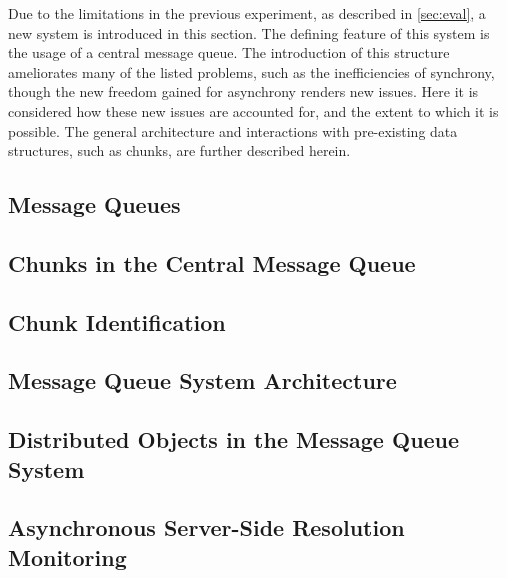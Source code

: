 Due to the limitations in the previous experiment, as described in \cref{sec:eval}, a new system is introduced in this section.
The defining feature of this system is the usage of a central message queue.
The introduction of this structure ameliorates many of the listed problems, such as the inefficiencies of synchrony, though the new freedom gained for asynchrony renders new issues.
Here it is considered how these new issues are accounted for, and the extent to which it is possible.
The general architecture and interactions with pre-existing data structures, such as chunks, are further described herein.

\subsection{Message Queues}\label{central-message-queue}

\subsection{Chunks in the Central Message Queue}

\subsection{Chunk Identification}

\subsection{Message Queue System Architecture}\label{sec:mq-arch}

\subsection{Distributed Objects in the Message Queue System}

\subsection{Asynchronous Server-Side Resolution Monitoring}

